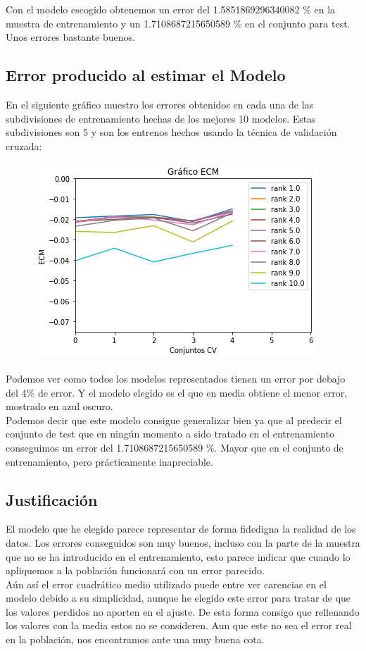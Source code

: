 \documentclass[a4paper,11pt]{article}
\begin{document}
Con el modelo escogido obtenemos un error del 1.5851869296340082 $\%$
en la muestra de entrenamiento y un 1.7108687215650589 $\%$ en el conjunto para test. Unos errores bastante buenos.

\subsection{Error producido al estimar el Modelo}

En el siguiente gráfico muestro los errores obtenidos en cada una de las subdivisiones de entrenamiento hechas de los mejores 10 modelos. Estas subdivisiones son 5 y son los entrenos hechos usando la técnica de validación cruzada:

\begin{figure}[h]
\includegraphics[scale=0.558]{erroresECM}
\centering
\end{figure}

Podemos ver como todos los modelos representados tienen un error por debajo del 4$\%$ de error. Y el modelo elegido es el que en media obtiene el menor error, mostrado en azul oscuro.\\

Podemos decir que este modelo consigue generalizar bien ya que al predecir el conjunto de test que en ningún momento a sido tratado en el entrenamiento conseguimos un error del 1.7108687215650589 $\%$. Mayor que en el conjunto de entrenamiento, pero prácticamente inapreciable.

\subsection{Justificación}

El modelo que he elegido parece representar de forma fidedigna la realidad de los datos. Los errores conseguidos son muy buenos, incluso con la parte de la muestra que no se ha introducido en el entrenamiento, esto parece indicar que cuando lo apliquemos a la población funcionará con un error parecido.\\

Aún así el error cuadrático medio utilizado puede entre ver carencias en el modelo debido a su simplicidad, aunque he elegido este error para tratar de que los valores perdidos no aporten en el ajuste. De esta forma consigo que rellenando los valores con la media estos no se consideren. Aun que este no sea el error real en la población, nos encontramos ante una muy buena cota.\\
\end{document}

